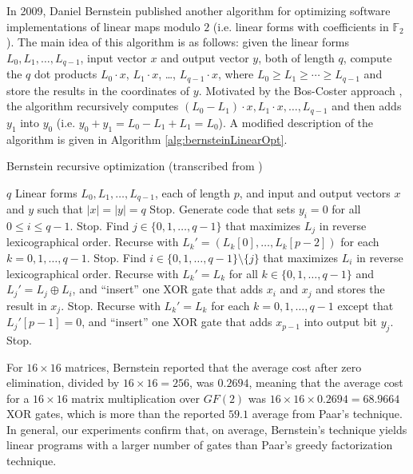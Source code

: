 In 2009, Daniel Bernstein \cite{Bernstein09-1} published another algorithm for optimizing software implementations of linear maps modulo $2$ (i.e. linear forms with coefficients in $\mathbb{F}_2$). The main idea of this algorithm is as follows: given the linear forms $L_0,L_1,\dots,L_{q-1}$, input vector $x$ and output vector $y$, both of length $q$, compute the $q$ dot products $L_0 \cdot x$, $L_1 \cdot x$, \dots, $L_{q-1} \cdot x$, where $L_0 \geq L_1 \geq \dotsb \geq L_{q-1}$ and store the results in the coordinates of $y$. Motivated by the Bos-Coster approach \cite{Rooji95-1}, the algorithm recursively computes $(L_0 - L_1) \cdot x, L_1\cdot x,\dots, L_{q-1}$ and then adds $y_1$ into $y_0$ (i.e. $y_0 + y_1 = L_0 - L_1 + L_1 = L_0$). A modified description of the algorithm is given in Algorithm \ref{alg:bernsteinLinearOpt}.

\begin{algorithm}[ht!] %
\caption{Bernstein recursive optimization (transcribed from \cite{Bernstein09-1})} \label{alg:bernsteinLinearOpt}
\begin{algorithmic}[1]
	\Require $q$ Linear forms $L_0,L_1,\dots,L_{q-1}$, each of length $p$, and input and output vectors $x$ and $y$ such that $|x| = |y| = q$
		\State Stop.
	\EndIf
		\State Generate code that sets $y_i = 0$ for all $0 \leq i \leq q-1$.
		\State Stop.
	\EndIf
	\State Find $j \in \{0,1,\dots,q-1\}$ that maximizes $L_j$ in reverse lexicographical order.
		\State Recurse with $L_k' = (L_k[0],\dots,L_k[p-2])$ for each $k = 0,1,\dots,q-1$.
		\State Stop.
	\EndIf
		\State Find $i \in \{0,1,\dots,q-1\} \setminus \{j\}$ that maximizes $L_i$ in reverse lexicographical order.
			\State Recurse with $L_k' = L_k$ for all $k \in \{0,1,\dots,q-1\}$ and $L_j' = L_j \oplus L_i$, and ``insert'' one
			XOR gate that adds $x_i$ and $x_j$ and stores the result in $x_j$.
			\State Stop.
		\EndIf
		\State Recurse with $L_k' = L_k$ for each $k = 0,1,\dots,q-1$ except that $L_j'[p-1] = 0$, and ``insert'' one
		XOR gate that adds $x_{p-1}$ into output bit $y_j$.
		\State Stop.
	\EndIf
\end{algorithmic}
\end{algorithm}

For $16 \times 16$ matrices, Bernstein reported that the average cost after zero elimination, divided by $16 \times 16 = 256$, was $0.2694$, meaning that the average cost for a $16 \times 16$ matrix multiplication over $GF(2)$ was $16 \times 16 \times 0.2694 = 68.9664$ XOR gates, which is more than the reported $59.1$ average from Paar's technique. In general, our experiments confirm that, on average, Bernstein's technique yields linear programs with a larger number of gates than Paar's greedy factorization technique. 

